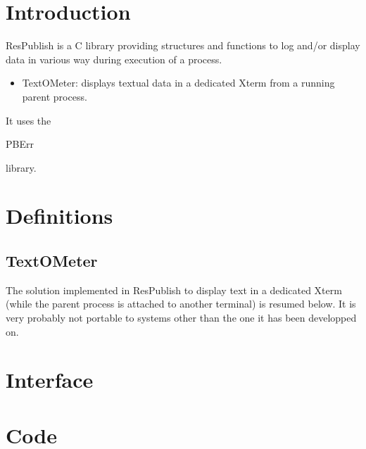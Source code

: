 \section*{Introduction}

ResPublish is a C library providing structures and functions to log and/or display data in various way during execution of a process.\\ 

\begin{itemize}
\item TextOMeter: displays textual data in a dedicated Xterm from a running parent process.
\end{itemize}

It uses the \begin{ttfamily}PBErr\end{ttfamily} library.\\

\section{Definitions}

\subsection{TextOMeter}

The solution implemented in ResPublish to display text in a dedicated Xterm (while the parent process is attached to another terminal) is resumed below. It is very probably not portable to systems other than the one it has been developped on.\\
\begin{scriptsize}
\begin{ttfamily}

\end{ttfamily}
\end{scriptsize}

\section{Interface}

\begin{scriptsize}
\begin{ttfamily}

\end{ttfamily}
\end{scriptsize}

\section{Code}


